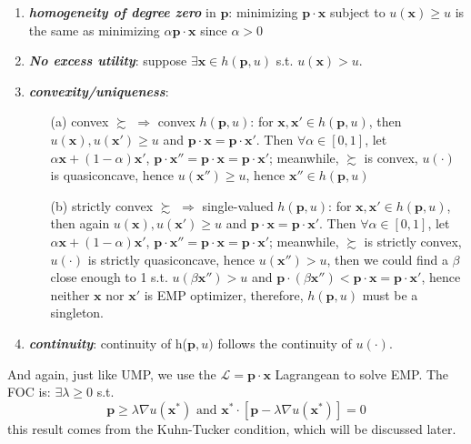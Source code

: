 \begin{enumerate}
    \item \textit{\textbf{homogeneity of degree zero}} in $\mathbf{p}$: minimizing $\mathbf{p}\cdot\mathbf{x}$ subject to $u(\mathbf{x})\geq u$ is the same as minimizing $\alpha \mathbf{p}\cdot\mathbf{x}$ since $\alpha >0$
    \item \textit{\textbf{No excess utility}}: suppose $\exists \mathbf{x}\in h(\mathbf{p},u)$ s.t. $u(\mathbf{x})>u$. 
    \item \textit{\textbf{convexity/uniqueness}}:
    \begin{enumerate}
        \item[(a)] convex $\succsim$ $\Rightarrow$ convex $ h(\mathbf{p},u)$: for $\mathbf{x},\mathbf{x}'\in h(\mathbf{p},u)$, then $u(\mathbf{x}),u(\mathbf{x}')\geq u$ and $\mathbf{p}\cdot\mathbf{x}=\mathbf{p}\cdot\mathbf{x}'$. Then $\forall \alpha\in[0,1]$, let $\alpha\mathbf{x}+(1-\alpha)\mathbf{x}'$, $\mathbf{p}\cdot\mathbf{x}''=\mathbf{p}\cdot\mathbf{x}=\mathbf{p}\cdot\mathbf{x}'$; meanwhile, $\succsim$ is convex, $u(\cdot)$ is quasiconcave, hence $u(\mathbf{x}'')\geq u$, hence $\mathbf{x}''\in h(\mathbf{p},u)$
        \item[(b)] strictly convex $\succsim$ $\Rightarrow$ single-valued $ h(\mathbf{p},u)$: for $\mathbf{x},\mathbf{x}'\in h(\mathbf{p},u)$, then again $u(\mathbf{x}),u(\mathbf{x}')\geq u$ and $\mathbf{p}\cdot\mathbf{x}=\mathbf{p}\cdot\mathbf{x}'$. Then $\forall \alpha\in[0,1]$, let $\alpha\mathbf{x}+(1-\alpha)\mathbf{x}'$, $\mathbf{p}\cdot\mathbf{x}''=\mathbf{p}\cdot\mathbf{x}=\mathbf{p}\cdot\mathbf{x}'$; meanwhile, $\succsim$ is strictly convex, $u(\cdot)$ is strictly quasiconcave, hence $u(\mathbf{x}'')> u$, then we could find a $\beta$ close enough to 1 s.t. $u(\beta\mathbf{x}'')>u$ and $\mathbf{p}\cdot(\beta \mathbf{x}'')<\mathbf{p}\cdot \mathbf{x}=\mathbf{p}\cdot \mathbf{x}'$, hence neither $\mathbf{x}$ nor $\mathbf{x}'$ is EMP optimizer, therefore, $h(\mathbf{p},u)$ must be a singleton.
    \end{enumerate}
    \item \textit\textbf{continuity}: continuity of h($\mathbf{p},u)$ follows the continuity of $u(\cdot)$.
\end{enumerate}

And again, just like UMP, we use the $\mathcal{L}=\mathbf{p}\cdot\mathbf{x}$ Lagrangean to solve EMP. The FOC is: $\exists \lambda \geq 0$ s.t.
$$\mathbf{p}\geq \lambda\nabla u(\mathbf{x}^*)\text{ and }\mathbf{x}^*\cdot[\mathbf{p}-\lambda \nabla u(\mathbf{x}^*)]=0$$
this result comes from the Kuhn-Tucker condition, which will be discussed later.

